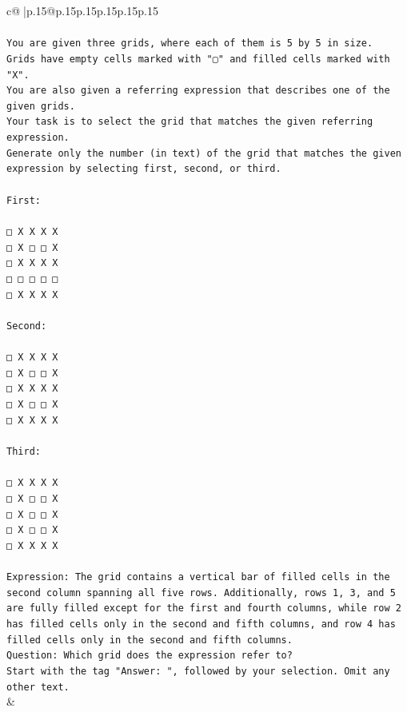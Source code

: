 \documentclass{article}
\begin{document}
{\begin{supertabular}{c@{$\;$}|p{.15\linewidth}@{}p{.15\linewidth}p{.15\linewidth}p{.15\linewidth}p{.15\linewidth}p{.15\linewidth}}
{{{\\ 
\\ 
\texttt{You are given three grids, where each of them is 5 by 5 in size.} \\
\texttt{Grids have empty cells marked with "▢" and filled cells marked with "X".} \\
\texttt{You are also given a referring expression that describes one of the given grids.} \\
\texttt{Your task is to select the grid that matches the given referring expression.} \\
\texttt{Generate only the number (in text) of the grid that matches the given expression by selecting first, second, or third.} \\
\\ 
\texttt{First:} \\
\\ 
\texttt{□ X X X X} \\
\texttt{□ X □ □ X} \\
\texttt{□ X X X X} \\
\texttt{□ □ □ □ □} \\
\texttt{□ X X X X} \\
\\ 
\texttt{Second:} \\
\\ 
\texttt{□ X X X X} \\
\texttt{□ X □ □ X} \\
\texttt{□ X X X X} \\
\texttt{□ X □ □ X} \\
\texttt{□ X X X X} \\
\\ 
\texttt{Third:} \\
\\ 
\texttt{□ X X X X} \\
\texttt{□ X □ □ X} \\
\texttt{□ X □ □ X} \\
\texttt{□ X □ □ X} \\
\texttt{□ X X X X} \\
\\ 
\texttt{Expression: The grid contains a vertical bar of filled cells in the second column spanning all five rows. Additionally, rows 1, 3, and 5 are fully filled except for the first and fourth columns, while row 2 has filled cells only in the second and fifth columns, and row 4 has filled cells only in the second and fifth columns.} \\
\texttt{Question: Which grid does the expression refer to?} \\
\texttt{Start with the tag "Answer: ", followed by your selection. Omit any other text.} \\
            }
        }
    }
    & \\ \\


\end{supertabular}}
\end{document}
